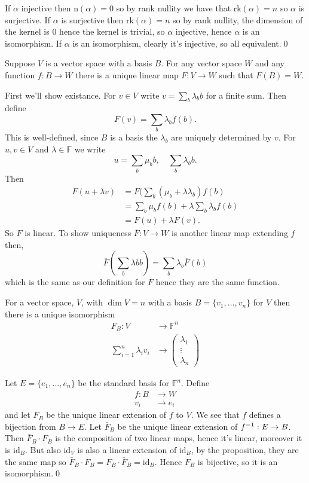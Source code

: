 \documentclass{article}
\newcommand{\F}{\mathbb{F}}
\newcommand{\n}{\mathrm{n}}
\newcommand{\rk}{\mathrm{rk}}
\begin{document}
\pf If $ \alpha $ injective then $ \n(\alpha)=0 $ so by rank nullity we have that $ \rk(\alpha)=n $ so $ \alpha $ is surjective. If $ \alpha $ is surjective then $ \rk(\alpha)=n $ so by rank nullity, the dimension of the kernel is $ 0 $ hence the kernel is trivial, so $ \alpha $ injective, hence $ \alpha $ is an isomorphism. If $ \alpha $ is an isomorphism, clearly it's injective, so all equivalent.\qed
\begin{proposition}
  Suppose $ V $ is a vector space with a basis $ B $. For any vector space $ W	 $ and any function $ f:B\to W $ there is a unique linear map $ F:V\to W $ such that $ F(B)=W $.
\end{proposition}
\pf First we'll show existance. For $ v\in V $ write $ v=\sum_b\lambda_bb $ for a finite sum. Then define
\[
  F(v)=\sum_b \lambda_bf(b).
\]
This is well-defined, since $ B $ is a basis the $ \lambda_b $ are uniquely determined by $ v $. For $ u,v\in V $ and $ \lambda\in \F $ we write
\[
  u=\sum_b\mu_bb,\quad \sum_b\lambda_bb.
\]
Then \begin{align*}
	F(u+\lambda v)&=F(\sum_b(\mu_b+\lambda\lambda_b)f(b)\\
		     &= \sum_b\mu_bf(b)+\lambda\sum_b\lambda_bf(b)\\
		     &= F(u)+\lambda F(v).
\end{align*}
So $ F $ is linear. To show uniqueness $ \overline F:V\to W $ is another linear map extending $ f $ then,
\[
  \overline F\left(\sum_b\lambda bb\right)=\sum_b\lambda_b\overline F(b)
\]
which is the same as our definition for $ F $ hence they are the same function.
\begin{corollary}
	For a vector space, $ V $, with $ \dim V=n $ with a basis $ B=\{v_1,\dots, v_n\} $ for $ V $ then there is a unique isomorphism
  \begin{align*}
	  F_B:V&\to \F^n\\
	       \sum_{i=1}^n\lambda_iv_i &\to \begin{pmatrix}
	        \lambda_1\\
		\vdots \\
		\lambda_n
	      \end{pmatrix}
  \end{align*}
  \end{corollary}
  \pf Let $ E=\{e_1,\dots, e_n\} $ be the standard basis for $ \F^n $. Define
  \begin{align*}
	  f:B&\to W\\
	  v_i&\to e_i
  \end{align*}
  and let $ F_B $ be the unique linear extension of $ f $ to $ V $. We see that $ f $ defines a bijection from $ B\to E $. Let $ \bar F_B $ be the unique linear extension of $ {f}^{-1}:E\to B $. Then $ \bar F_B\cdot F_B $ is the composition of two linear maps, hence it's linear, moreover it is $ \mathrm{id}_B $. But also $ \mathrm{id}_V $ is also a linear extension of $ \mathrm{id}_B $, by the proposition, they are the same map so $ \bar F_B\cdot F_B=F_B\cdot \bar F_B=\mathrm{id}_B $. Hence $ F_B $ is bijective, so it is an isomorphism.\qed
\end{document}
